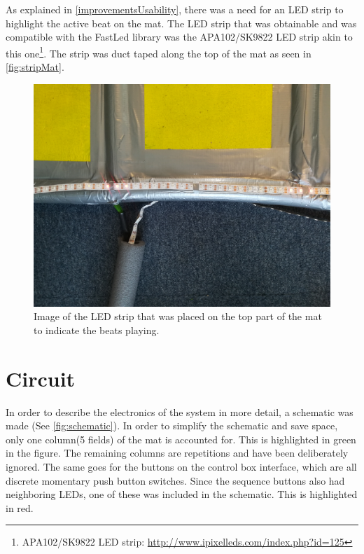  	As explained in \autoref{improvementsUsability}, there was a need for an LED strip to highlight the active beat on the mat. The LED strip that was obtainable and was compatible with the FastLed library was the APA102/SK9822 LED strip akin to this one\footnote{APA102/SK9822 LED strip: \url{http://www.ipixelleds.com/index.php?id=125}}. The strip was duct taped along the top of the mat as seen in \autoref{fig:stripMat}.
 	
 	\begin{figure}[H]
 		\centering
 		\includegraphics[width=0.8\linewidth]{figure/Implementation/stripMat}
 		\caption{Image of the LED strip that was placed on the top part of the mat to indicate the beats playing.}
 		\label{fig:stripMat}
 	\end{figure}
	
\section{Circuit}
In order to describe the electronics of the system in more detail, a schematic was made (See \autoref{fig:schematic}).
In order to simplify the schematic and save space, only one column(5 fields) of the mat is accounted for. This is highlighted in green in the figure. The remaining columns are repetitions and have been deliberately ignored. The same goes for the buttons on the control box interface, which are all discrete momentary push button switches. Since the sequence buttons also had neighboring LEDs, one of these was included in the schematic. This is highlighted in red.

